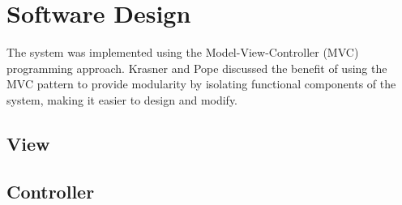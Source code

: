 \section{Software Design}

The system was implemented using the Model-View-Controller (MVC) programming approach. Krasner and Pope \autocite{krasner-pope-88} discussed the benefit of using the MVC pattern to provide modularity by isolating functional components of the system, making it easier to design and modify.


 \subsection{View}
 \subsection{Controller}